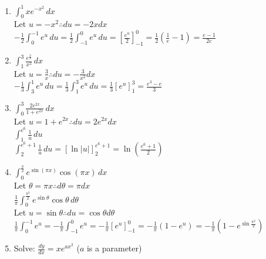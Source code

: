 \documentclass[10pt, letterpaper]{report}
\begin{document}
\begin{enumerate}
  \item{$\int_{0}^{1}{xe^{-x^{2}}}\,dx$} \\

    Let $u=-x^{2}\therefore du=-2xdx$ \\

    $-\frac{1}{2}\int_{0}^{-1}{e^{u}}\,du=\frac{1}{2}\int_{-1}^{0}{e^{u}}\,du=
    [\frac{e^{u}}{2}]_{-1}^{0}=\frac{1}{2}\left(\frac{1}{e}-1\right)=\frac{e-1}{2e}$

  \item{$\int_{1}^{3}{\frac{e^{\frac{3}{x}}}{x^{2}}}\,dx$} \\

    Let $u=\frac{3}{x}\therefore du=-\frac{3}{x^{2}}dx$ \\

    $-\frac{1}{3}\int_{3}^{1}{e^{u}}\,du=\frac{1}{3}\int_{1}^{3}{e^{u}}\,du=
    \frac{1}{3}[e^{u}]_{1}^{3}=\frac{e^{3}-e}{3}$ \\
\pagebreak
  \item{$\int_{0}^{3}{\frac{2e^{2x}}{1+e^{2x}}}\,dx$} \\

    Let $u=1+e^{2x}\therefore du=2e^{2x}dx$ \\

    $\int_{1}^{e^{6}}{\frac{1}{u}}\,du$ \\

    $\int_{2}^{e^{6}+1}{\frac{1}{u}}\,du=[\ln{|u|}]_{2}^{e^{6}+1}=\ln{\left(\frac{e^{6}+1}{2}\right)}$ \\

  \item{$\int_{0}^{\frac{\pi}{2}}{e^{\sin{(\pi x)}}\cos{(\pi x)}}\,dx$} \\

    Let $\theta = \pi x\therefore d\theta = \pi dx$ \\

    $\frac{1}{\pi}\int_{0}^{\frac{\pi^{2}}{2}}{e^{\sin{\theta}}\cos{\theta}\,d\theta}$ \\

    Let $u=\sin{\theta}\therefore du=\cos{\theta}d\theta$ \\

    $\frac{1}{\pi}\int_{0}^{-1}{e^{u}}=-\frac{1}{\pi}\int_{-1}^{0}{e^{u}}=
    -\frac{1}{\pi}[e^{u}]_{-1}^{0}=-\frac{1}{\pi}(1-e^{u})=-\frac{1}{\pi}\left(1-e^{\sin{\frac{\pi^{2}}{2}}}\right)$ \\
    \hline
  \item{Solve: $\frac{dy}{dx}=xe^{ax^{2}}$ ($a$ is a parameter)} \\


\end{enumerate}
\end{document}
